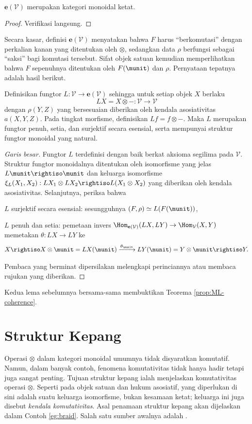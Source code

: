 \begin{lemma}
	$\mathbf{e}(\mathcal{V})$ merupakan kategori monoidal ketat.
\end{lemma}
\begin{proof}
	Verifikasi langsung.
\end{proof}

Secara kasar, definisi $\mathbf{e}(\mathcal{V})$ menyatakan bahwa $F$ harus ``berkomutasi'' dengan perkalian kanan yang ditentukan oleh $\otimes$, sedangkan data $\rho$ berfungsi sebagai ``saksi'' bagi komutasi tersebut. Sifat objek satuan kemudian memperlihatkan bahwa $F$ sepenuhnya ditentukan oleh $F(\munit)$ dan $\rho$. Pernyataan tepatnya adalah hasil berikut.
\begin{lemma}
	Definisikan fungtor $L: \mathcal{V} \to \mathbf{e}(\mathcal{V})$ sehingga untuk setiap objek $X$ berlaku
	\[ LX = X \otimes -: \mathcal{V} \to \mathcal{V} \]
	dengan $\rho(Y, Z)$ yang bersesuaian diberikan oleh kendala asosiativitas $a(X, Y, Z)$. Pada tingkat morfisme, definisikan $Lf = f \otimes -$. Maka $L$ merupakan fungtor penuh, setia, dan surjektif secara esensial, serta mempunyai struktur fungtor monoidal yang natural.
\end{lemma}
\begin{proof}[Garis besar]
	Fungtor $L$ terdefinisi dengan baik berkat aksioma segilima pada $\mathcal{V}$. Struktur fungtor monoidalnya ditentukan oleh isomorfisme yang jelas $L\munit \rightiso \munit$ dan keluarga isomorfisme $\xi_L(X_1, X_2): LX_1 \otimes LX_2 \rightiso L(X_1 \otimes X_2)$ yang diberikan oleh kendala asosiativitas. Selanjutnya, periksa bahwa
	\begin{compactitem}
		\item $L$ surjektif secara esensial: sesungguhnya $(F, \rho) \simeq L(F(\munit))$,
		\item $L$ penuh dan setia: pemetaan invers $\Hom_{\mathbf{e}(\mathcal{V})}(LX, LY) \to \Hom_{\mathcal{V}}(X, Y)$ memetakan $\theta: LX \to LY$ ke
			\[ X \rightiso X \otimes \munit = LX(\munit) \xrightarrow{\theta_\munit} LY(\munit) = Y \otimes \munit \rightiso Y. \]
	\end{compactitem}
	Pembaca yang berminat dipersilakan melengkapi perinciannya atau membaca rujukan yang diberikan.
\end{proof}
Kedua lema sebelumnya bersama-sama membuktikan Teorema \ref{prop:ML-coherence}.

\section{Struktur Kepang}\label{sec:braiding}
Operasi $\otimes$ dalam kategori monoidal umumnya tidak disyaratkan komutatif. Namun, dalam banyak contoh, fenomena komutativitas tidak hanya hadir tetapi juga sangat penting. Tujuan struktur kepang ialah menjelaskan komutativitas operasi $\otimes $. Seperti pada objek satuan dan hukum asosiatif, yang diperlukan di sini adalah suatu keluarga isomorfisme, bukan kesamaan ketat; keluarga ini juga disebut \emph{kendala komutativitas}. Asal penamaan struktur kepang akan dijelaskan dalam Contoh \ref{eg:braid}. Salah satu sumber awalnya adalah \cite{JS93}.

